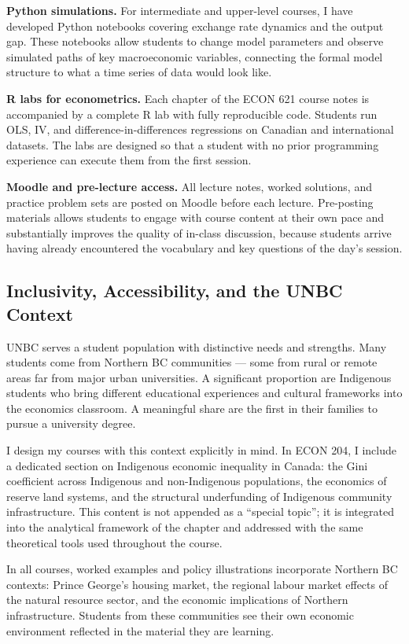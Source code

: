 \documentclass[11pt,letterpaper]{article}
\begin{document}
\textbf{Python simulations.} For intermediate and upper-level courses, I have developed Python notebooks covering exchange rate dynamics and the output gap. These notebooks allow students to change model parameters and observe simulated paths of key macroeconomic variables, connecting the formal model structure to what a time series of data would look like.

\textbf{R labs for econometrics.} Each chapter of the ECON 621 course notes is accompanied by a complete R lab with fully reproducible code. Students run OLS, IV, and difference-in-differences regressions on Canadian and international datasets. The labs are designed so that a student with no prior programming experience can execute them from the first session.

\textbf{Moodle and pre-lecture access.} All lecture notes, worked solutions, and practice problem sets are posted on Moodle before each lecture. Pre-posting materials allows students to engage with course content at their own pace and substantially improves the quality of in-class discussion, because students arrive having already encountered the vocabulary and key questions of the day's session.

\subsection{Inclusivity, Accessibility, and the UNBC Context}

UNBC serves a student population with distinctive needs and strengths. Many students come from Northern BC communities --- some from rural or remote areas far from major urban universities. A significant proportion are Indigenous students who bring different educational experiences and cultural frameworks into the economics classroom. A meaningful share are the first in their families to pursue a university degree.

I design my courses with this context explicitly in mind. In ECON 204, I include a dedicated section on Indigenous economic inequality in Canada: the Gini coefficient across Indigenous and non-Indigenous populations, the economics of reserve land systems, and the structural underfunding of Indigenous community infrastructure. This content is not appended as a ``special topic''; it is integrated into the analytical framework of the chapter and addressed with the same theoretical tools used throughout the course.

In all courses, worked examples and policy illustrations incorporate Northern BC contexts: Prince George's housing market, the regional labour market effects of the natural resource sector, and the economic implications of Northern infrastructure. Students from these communities see their own economic environment reflected in the material they are learning.
\end{document}
